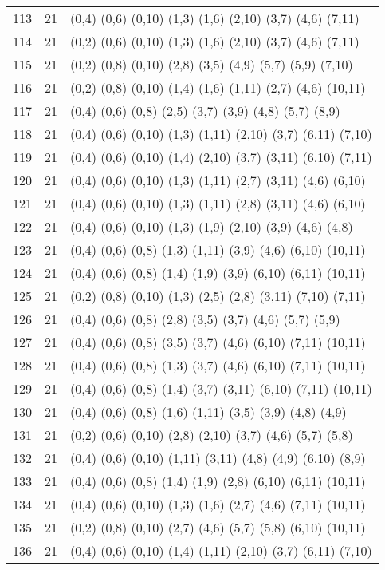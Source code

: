 {\begin{longtable}{lll}
113 & 21 & (0,4) (0,6) (0,10) (1,3) (1,6) (2,10) (3,7) (4,6) (7,11) \\
114 & 21 & (0,2) (0,6) (0,10) (1,3) (1,6) (2,10) (3,7) (4,6) (7,11) \\
115 & 21 & (0,2) (0,8) (0,10) (2,8) (3,5) (4,9) (5,7) (5,9) (7,10) \\
116 & 21 & (0,2) (0,8) (0,10) (1,4) (1,6) (1,11) (2,7) (4,6) (10,11) \\
117 & 21 & (0,4) (0,6) (0,8) (2,5) (3,7) (3,9) (4,8) (5,7) (8,9) \\
118 & 21 & (0,4) (0,6) (0,10) (1,3) (1,11) (2,10) (3,7) (6,11) (7,10) \\
119 & 21 & (0,4) (0,6) (0,10) (1,4) (2,10) (3,7) (3,11) (6,10) (7,11) \\
120 & 21 & (0,4) (0,6) (0,10) (1,3) (1,11) (2,7) (3,11) (4,6) (6,10) \\
121 & 21 & (0,4) (0,6) (0,10) (1,3) (1,11) (2,8) (3,11) (4,6) (6,10) \\
122 & 21 & (0,4) (0,6) (0,10) (1,3) (1,9) (2,10) (3,9) (4,6) (4,8) \\
123 & 21 & (0,4) (0,6) (0,8) (1,3) (1,11) (3,9) (4,6) (6,10) (10,11) \\
124 & 21 & (0,4) (0,6) (0,8) (1,4) (1,9) (3,9) (6,10) (6,11) (10,11) \\
125 & 21 & (0,2) (0,8) (0,10) (1,3) (2,5) (2,8) (3,11) (7,10) (7,11) \\
126 & 21 & (0,4) (0,6) (0,8) (2,8) (3,5) (3,7) (4,6) (5,7) (5,9) \\
127 & 21 & (0,4) (0,6) (0,8) (3,5) (3,7) (4,6) (6,10) (7,11) (10,11) \\
128 & 21 & (0,4) (0,6) (0,8) (1,3) (3,7) (4,6) (6,10) (7,11) (10,11) \\
129 & 21 & (0,4) (0,6) (0,8) (1,4) (3,7) (3,11) (6,10) (7,11) (10,11) \\
130 & 21 & (0,4) (0,6) (0,8) (1,6) (1,11) (3,5) (3,9) (4,8) (4,9) \\
131 & 21 & (0,2) (0,6) (0,10) (2,8) (2,10) (3,7) (4,6) (5,7) (5,8) \\
132 & 21 & (0,4) (0,6) (0,10) (1,11) (3,11) (4,8) (4,9) (6,10) (8,9) \\
133 & 21 & (0,4) (0,6) (0,8) (1,4) (1,9) (2,8) (6,10) (6,11) (10,11) \\
134 & 21 & (0,4) (0,6) (0,10) (1,3) (1,6) (2,7) (4,6) (7,11) (10,11) \\
135 & 21 & (0,2) (0,8) (0,10) (2,7) (4,6) (5,7) (5,8) (6,10) (10,11) \\
136 & 21 & (0,4) (0,6) (0,10) (1,4) (1,11) (2,10) (3,7) (6,11) (7,10) \\

\end{longtable}}
